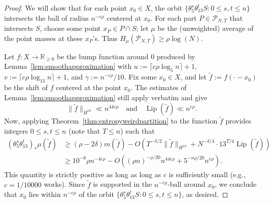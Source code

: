 \documentclass[11pt]{amsart}
\theoremstyle{definition}
\DeclareMathOperator{\Lip}{Lip}
\begin{document}
\begin{proof}
We will show that for each point $x_0 \in X$, the orbit $\{\theta_5^s \theta_{13}^t S: 0 \le s,t \le n\}$ intersects the ball of radius $n^{-c\rho}$ centered at $x_0$.
For each part $P \in \mathcal{P}_{N,T}$ that intersects $S$, choose some point $x_P \in P \cap S$; let $\mu$ be the (unweighted) average of the point masses at these $x_P$'s.  Thus $H_\mu(\mathcal{P}_{N,T}) \ge \rho \log(N)$.

Let $f: X \to \mathbb{R}_{\geq 0}$ be the bump function around $0$ produced by Lemma~\ref{lem:smoothapproximation} with $u:=\lceil c\rho \log_5 n \rceil+1$, $v:=\lceil c\rho \log_{13} n \rceil+1$, and $\gamma:=n^{-c\rho}/10$.  Fix some $x_0 \in X$, and let $\widetilde f:=f(\cdot-x_0)$ be the shift of $f$ centered at the point $x_0$.  The estimates of Lemma~\ref{lem:smoothapproximation} still apply verbatim and give
$$\|\widetilde{f}\|_{H^{10}} \ll n^{44c\rho} \quad \text{and} \quad \Lip(\widetilde f) \ll n^{c\rho}.$$
Now, applying Theorem~\ref{thm:entropyweirdpartition} to the function $\widetilde f$ provides integers $0 \leq s,t \leq n$ (note that $T \leq n$) such that
\begin{align*}
(\theta_5^s \theta_{13}^t)_*\mu(\widetilde f) &\ge \left(\rho - 2\delta\right)m(\widetilde f) - O(T^{-\delta/2}\|\widetilde f\|_{H^{10}}+N^{-\delta/4} \cdot 13^{T/4} \Lip(\widetilde f))\\
 & \geq 10^{-6}\rho n^{-4c\rho}-O((\rho n)^{-\rho/20}n^{44c\rho}+5^{-n\rho/20} n^{c\rho}).
\end{align*}
This quantity is strictly positive as long as long as $c$ is sufficiently small (e.g., $c=1/10000$ works).  Since $\widetilde f$ is supported in the $n^{-c\rho}$-ball around $x_0$, we conclude that $x_0$ lies within $n^{-c\rho}$ of the orbit $\{\theta_5^s \theta_{13}^t S: 0 \le s,t \le n\}$, as desired.
%
\end{proof}
\end{document}
